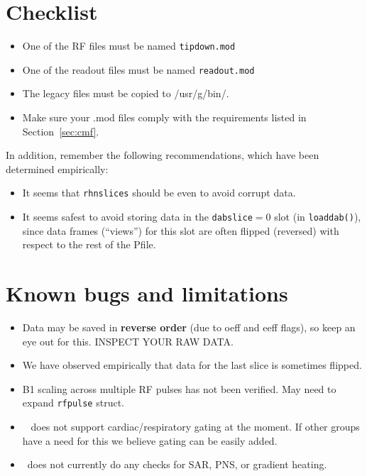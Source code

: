 \section{Checklist}

\begin{itemize}
	\item One of the RF files must be named {\tt tipdown.mod} 
	\item One of the readout files must be named {\tt readout.mod}
	\item The legacy files must be copied to /usr/g/bin/.
	\item Make sure your .mod files comply with the requirements listed in Section~\ref{sec:cmf}.
\end{itemize}

In addition, remember the following recommendations, which have been determined empirically:
\begin{itemize}
	\item It seems that {\tt rhnslices} should be even to avoid corrupt data.
	\item It seems safest to avoid storing data in the {\tt dabslice}$=$0 slot (in \texttt{loaddab()}), since data frames (``views'') for this slot are often flipped (reversed) with respect to the rest of the Pfile.
\end{itemize}


\section{Known bugs and limitations}
\begin{itemize}
	\item Data may be saved in \textbf{reverse order} (due to oeff and eeff flags), so keep an eye out for this. INSPECT YOUR RAW DATA. %
	\item We have observed empirically that data for the last slice is sometimes flipped.
	\item B1 scaling across multiple RF pulses has not been verified. May need to expand \texttt{rfpulse} struct.
	\item \toppe~ does not support cardiac/respiratory gating at the moment. If other groups have a need for this we believe gating can be easily added.
	\item \toppe~does not currently do any checks for SAR, PNS, or gradient heating.
\end{itemize}


